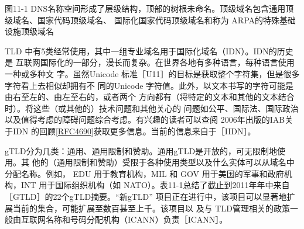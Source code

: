 图11-1
DNS名称空间形成了层级结构，顶部的树根未命名。顶级域名包含通用顶级域名、国家代码顶级域名、
国际化国家代码顶级域名和称为 ARPA的特殊基础设施顶级域名

TLD 中有5类经常使用，其中一组专业域名用于国际化域名（IDN）\footnotemark。IDN的历史是
互联网国际化的一部分，漫长而复杂。在世界各地有多种语言，每种语言使用一种或多种文
字。虽然Unicode 标准［U11］的目标是获取整个字符集，但是很多字符看上去相似却拥有不
同的Unicode 字符值。此外，以文本书写的字符可能是由右至左的、由左至右的，或者两个
方向都有（将特定的文本和其他的文本结合时）。将这些（或其他的）技术问题和其他关心的
问题如公平、国际法、国际政治以及值得考虑的障碍问题综合考虑。有兴趣的读者可以查阅
2006年出版的IAB关于IDN 的回顾\href{https://www.rfc-editor.org/rfc/rfc4690}{[RFC4690]}获取更多信息。当前的信息来自于［IIDN］。

gTLD分为几类：通用、通用限制和赞助。通用gTLD是开放的，可无限制地使用。其
他的（通用限制和赞助）受限于各种使用类型以及什么实体可以从域名中分配名称。例如，
EDU 用于教育机构，MIL 和 GOV 用于美国的军事和政府机构，INT 用于国际组织机构（如
NATO）。表11-1总结了截止到2011年年中来自［GTLD］的22个gTLD摘要。“新gTLD”
项目正在进行中，该项目可以显著地扩展当前的集合，可能扩展至数百甚至上千。该项目以
及与 TLD管理相关的政策一般由互联网名称和号码分配机构（ICANN）负责［ICANN］。

